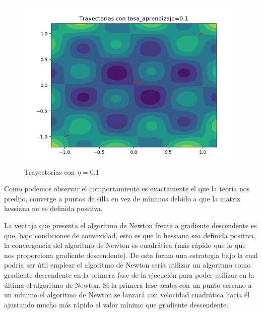 \documentclass[12pt,a4paper]{article}
\begin{document}
\begin{figure}[H]
	\centering
	\includegraphics[scale=0.8]{./Imagenes/bonus13.png}
	\caption{Trayectorias con $\eta=0.1$}
\end{figure}

Como podemos observar el comportamiento es exactamente el que la teoría nos predijo, converge a puntos de silla en vez de mínimos debido a que la matriz hessiana no es definida positiva.

La ventaja que presenta el algoritmo de Newton frente a gradiente descendente es que, bajo condiciones de convexidad, esto es que la hessiana sea definida positiva, la convergencia del algoritmo de Newton es cuadrática (más rápido que lo que nos proporciona gradiente descendente). De esta forma una estrategia bajo la cual podría ser útil emplear el algoritmo de Newton sería utilizar un algoritmo como gradiente descendente en la primera fase de la ejecución para poder utilizar en la última el algoritmo de Newton. Si la primera fase acaba con un punto cercano a un mínimo el algoritmo de Newton se lanzará con velocidad cuadrática hacia él ajustando mucho más rápido el valor mínimo que gradiente descendente.
\end{document}
